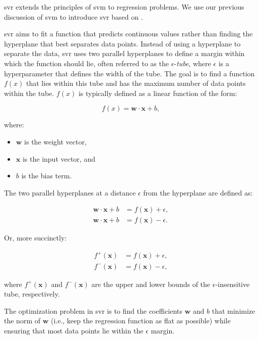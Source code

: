 \gls{svr} extends the principles of \gls{svm} to regression problems.
We use our previous discussion of \gls{svm} to introduce \gls{svr} based on \citet{druckerSVR}.

\gls{svr} aims to fit a function that predicts continuous values rather than finding the hyperplane that best separates data points.
Instead of using a hyperplane to separate the data, \gls{svr} uses two parallel hyperplanes to define a margin within which the function should lie, often referred to as the $\epsilon$-\textit{tube}, where $\epsilon$ is a hyperparameter that defines the width of the tube.
The goal is to find a function $f(x)$ that lies within this tube and has the maximum number of data points within the tube.
$f(x)$ is typically defined as a linear function of the form:

$$
f(x) = \mathbf{w} \cdot \mathbf{x} + b,
$$

where:

\begin{itemize}
	\item $\mathbf{w}$ is the weight vector,
	\item $\mathbf{x}$ is the input vector, and
	\item $b$ is the bias term.
\end{itemize}

The two parallel hyperplanes at a distance $\epsilon$ from the hyperplane are defined as:

$$
\begin{aligned}
    \mathbf{w} \cdot \mathbf{x} + b &= f(\mathbf{x}) + \epsilon, \\
    \mathbf{w} \cdot \mathbf{x} + b &= f(\mathbf{x}) - \epsilon.
\end{aligned}
$$

Or, more succinctly:

$$
\begin{aligned}
    f^+(\mathbf{x}) &= f(\mathbf{x}) + \epsilon, \\
    f^-(\mathbf{x}) &= f(\mathbf{x}) - \epsilon,
\end{aligned}
$$

where $f^+(\mathbf{x})$ and $f^-(\mathbf{x})$ are the upper and lower bounds of the $\epsilon$-insensitive tube, respectively.

The optimization problem in \gls{svr} is to find the coefficients $\mathbf{w}$ and $b$ that minimize the norm of $\mathbf{w}$ (i.e., keep the regression function as flat as possible) while ensuring that most data points lie within the $\epsilon$ margin.

